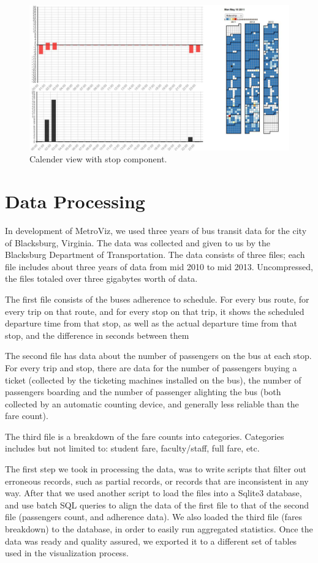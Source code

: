 \documentclass[journal]{vgtc}                %
\begin{document}
\begin{figure}[htb]
 \centering
 \includegraphics[width=16cm]{img/image08}
 \caption{Calender view with stop component.}
 \label{calendar_view_big}
\end{figure}
\section{Data Processing}

In development of MetroViz, we used three years of bus transit data for the city of Blacksburg, Virginia. The data was collected and given to us by the Blacksburg Department of Transportation. The data consists of three files; each file includes about three years of data from mid 2010 to mid 2013. Uncompressed, the files totaled over three gigabytes worth of data.

The first file consists of the buses adherence to schedule. For every bus route, for every trip on that route, and for every stop on that trip, it shows the scheduled departure time from that stop, as well as the actual departure time from that stop, and the difference in seconds between them

The second file has data about the number of passengers on the bus at each stop. For every trip and stop, there are data for the number of passengers buying a ticket (collected by the ticketing machines installed on the bus), the number of passengers boarding and the number of passenger alighting the bus (both collected by an automatic counting device, and generally less reliable than the fare count).

The third file is a breakdown of the fare counts into categories. Categories includes but not limited to: student fare, faculty/staff, full fare, etc.

The first step we took in processing the data, was to write scripts that filter out erroneous records, such as partial records, or records that are inconsistent in any way. After that we used another script to load the files into a Sqlite3 database, and use batch SQL queries to align the data of the first file to that of the second file (passengers count, and adherence data). We also loaded the third file (fares breakdown) to the database, in order to easily run aggregated statistics. Once the data was ready and quality assured, we exported it to a different set of tables used in the visualization process.
\end{document}
